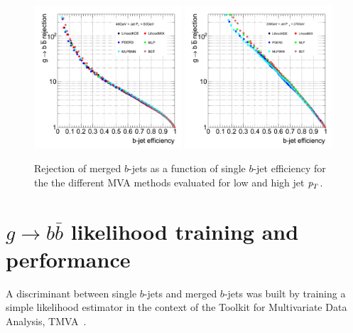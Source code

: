 \begin{figure}[tp]
\centering
\includegraphics[width=0.49\textwidth]{FIGS/TEMPFigs/MVA_differentMethods/bins/MVAs_RejvsEff40.pdf}
\includegraphics[width=0.49\textwidth]{FIGS/TEMPFigs/MVA_differentMethods/bins/MVAs_RejvsEff200.pdf}
\caption{Rejection of merged $b$-jets as a function of single $b$-jet efficiency for the the different MVA methods evaluated for low and high jet ${\emph{p}_{T}}$.}
\label{fig:diffmethodsPerfBins}
\end{figure}



\section{$g\rightarrow b\bar{b}$ likelihood training and performance}

A discriminant between single $b$-jets and merged $b$-jets was built by training a simple likelihood estimator in the context of the Toolkit for Multivariate Data Analysis, TMVA~\cite{Hocker:2007ht}.

